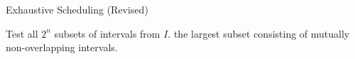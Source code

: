 \begin{algorithm}
\caption{Exhaustive Scheduling (Revised)}
\begin{algorithmic}
\STATE Test all $2^n$ subsets of intervals from $I$.
\RETURN the largest subset consisting of mutually non-overlapping intervals.
\ENDPROCEDURE
\end{algorithmic}
\end{algorithm}